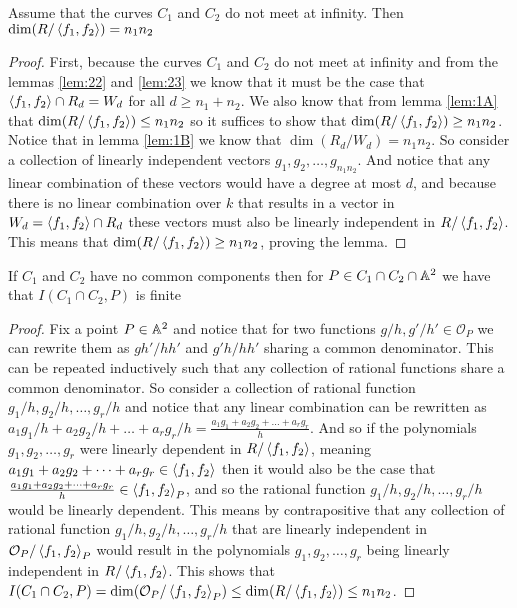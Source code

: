 \begin{lemma}
    \label{lem:2Ap}
    Assume that the curves $C_1$ and $C_2$ do not meet at infinity. Then $\dim(R/\left\langle f_1,f_2 \right\rangle)=n_1n_2$
\end{lemma}
\begin{proof}
   First, because the curves $C_1$ and $C_2$ do not meet at infinity and from the lemmas \ref{lem:22} and \ref{lem:23} we know that it must be the case that $\left\langle f_1,f_2 \right\rangle\cap R_d=W_d$ for all $d\geq n_1+n_2$. We also know that from lemma \ref{lem:1A} that $\dim(R/\left\langle f_1,f_2 \right\rangle)\leq n_1n_2$ so it suffices to show that $\dim(R/\left\langle f_1,f_2 \right\rangle)\geq n_1n_2$. Notice that in lemma \ref{lem:1B} we know that $\dim(R_d/W_d)=n_1n_2$. So consider a collection of linearly independent vectors $g_1,g_2,\dots, g_{n_1n_2}$. And notice that any linear combination of these vectors would have a degree at most $d$, and because there is no linear combination over $k$ that results in a vector in $W_d=\left\langle f_1,f_2 \right\rangle\cap R_d$ these vectors must also be linearly independent in $R/\left\langle f_1,f_2 \right\rangle$. This means that $\dim(R/\left\langle f_1,f_2 \right\rangle)\geq n_1n_2$, proving the lemma.
\end{proof}

\begin{prop}
\label{prop:finitness_of_I}
If $C_1$ and $C_2$ have no common components then for $P\in C_1\cap C_2\cap \mathbb{A}^2$ we have that $I(C_1\cap C_2, P)$ is finite
\end{prop}
\begin{proof}
    Fix a point $P\in\mathbb{A}^2$ and notice that for two functions $g/h, g'/h'\in \mathcal{O}_P$ we can rewrite them as $gh'/hh'$ and $g'h/hh'$ sharing a common denominator. This can be repeated inductively such that any collection of rational functions share a common denominator. So consider a collection of rational function $g_1/h,g_2/h,\dots, g_r/h$ and notice that any linear combination can be rewritten as $a_1g_1/h+a_2g_2/h+\dots+ a_rg_r/h=\frac{a_1g_1+a_2g_2+\dots+ a_rg_r}{h}$. And so if the polynomials $g_1,g_2,\dots,g_r$ were linearly dependent in $R/\left\langle f_1,f_2 \right\rangle$, meaning $a_1g_1+a_2g_2+\dots+ a_rg_r\in\left\langle f_1,f_2 \right\rangle$ then it would also be the case that $\frac{a_1g_1+a_2g_2+\dots+ a_rg_r}{h}\in \left\langle f_1,f_2 \right\rangle_P$, and so the rational function $g_1/h,g_2/h,\dots, g_r/h$ would be linearly dependent. This means by contrapositive that any collection of rational function $g_1/h,g_2/h,\dots, g_r/h$ that are linearly independent in $\mathcal{O}_P/\left\langle f_1,f_2 \right\rangle_P$ would result in the polynomials $g_1,g_2,\dots, g_r$ being linearly independent in $R/\left\langle f_1,f_2 \right\rangle$. This shows that $I(C_1\cap C_2, P)=\dim(\mathcal{O}_P/\left\langle f_1,f_2 \right\rangle_P)\leq \dim(R/\left\langle f_1,f_2 \right\rangle)\leq n_1n_2$.
\end{proof}

